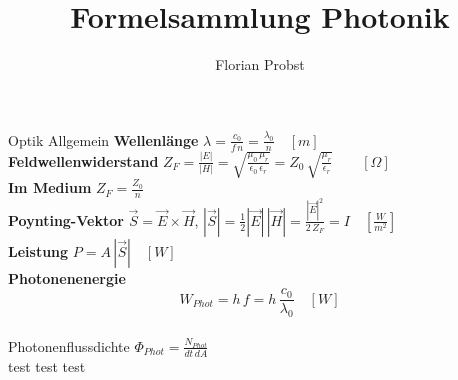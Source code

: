 \documentclass[8pt]{scrartcl}
\author{Florian Probst}
\title{Formelsammlung Photonik}
\begin{document}
	\begin{section}{Optik Allgemein}
		\textbf{Wellenlänge} $\lambda=\frac{c_0}{f\, n} = \frac{\lambda_0}{n}\quad[m]$\\[.2cm]
		\textbf{Feldwellenwiderstand} $Z_F=\frac{|E|}{|H|}=\sqrt{\frac{\mu_0 \, \mu_r}{\epsilon_0 \, \epsilon_r}}= Z_0 \, \sqrt{\frac{\mu_r}{\epsilon_r}} \qquad[\Omega]$\\[.2cm]
		\textbf{Im Medium} $Z_F = \frac{Z_0}{n}$\\[.2cm]
		\textbf{Poynting-Vektor} $\vec{S}=\vec{E}\times\vec{H}$, $|\vec{S}|=\frac{1}{2}|\vec{E}|\,|\vec{H}|=\frac{|\vec{E}|^2}{2\,Z_F}=I\quad [\frac{W}{m^2}]$\\[.2cm]
		\textbf{Leistung} $P= A\, |\vec{S}|\quad [W]$ \\[.2cm]
		\textbf{Photonenenergie} $$W_{Phot}= h\,f=h\, \frac{c_0}{\lambda_0}\quad [W]$$\\[.2cm]
		Photonenflussdichte $\Phi_{Phot}=\frac{N_{Phot}}{dt\,dA}$ \\
		test test test
		
	\end{section}
\end{document}
